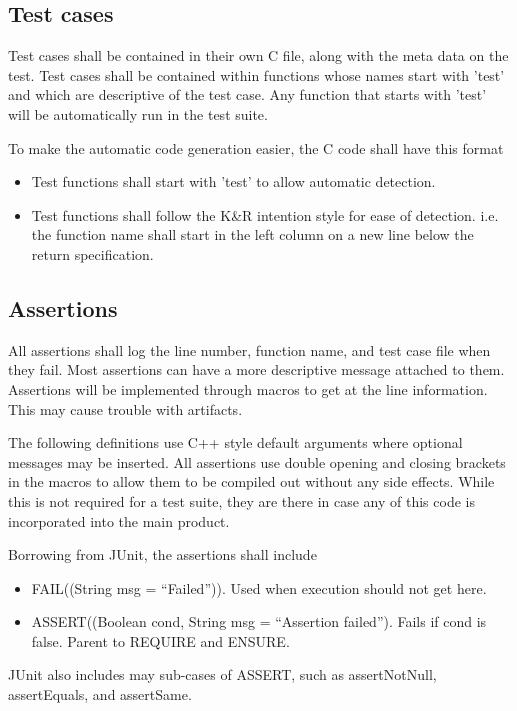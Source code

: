 \documentclass{widearticle}
\begin{document}
\subsection{Test cases}
Test cases shall be contained in their own C file, along with the meta
data on the test.  Test cases shall be contained within functions
whose names start with 'test' and which are descriptive of the test
case.  Any function that starts with 'test' will be automatically run in
the test suite.

To make the automatic code generation easier, the C code shall have
this format
\begin{itemize}
    \item Test functions shall start with 'test' to allow
automatic detection.
    \item Test functions shall follow the K\&R intention style for ease
of detection.  i.e. the function name shall start in the left
column on a new line below the return specification.
\end{itemize}

\subsection{Assertions}
All assertions shall log the line number, function name, and test
case file when they fail.  Most assertions can have a more descriptive
message attached to them.  Assertions will be implemented through
macros to get at the line information.  This may cause trouble with
artifacts.

The following definitions use C++ style default arguments where
optional messages may be inserted.  All assertions use double opening
and closing brackets in the macros to allow them to be compiled out
without any side effects.  While this is not required for a test
suite, they are there in case any of this code is incorporated into the
main product.

Borrowing from JUnit, the assertions shall include
\begin{itemize}
    \item FAIL((String msg = ``Failed'')).  Used when execution should
not get here.
    \item ASSERT((Boolean cond, String msg = ``Assertion failed'').
Fails if cond is false.  Parent to REQUIRE and ENSURE.
\end{itemize}

JUnit also includes may sub-cases of ASSERT, such as assertNotNull,
assertEquals, and assertSame.
\end{document}
